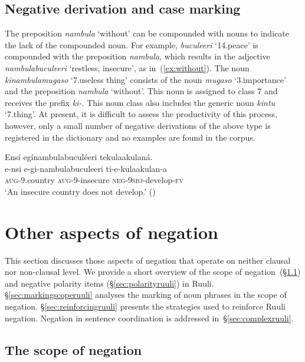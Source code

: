 \documentclass[output=paper,colorlinks,citecolor=brown,draftmode]{langscibook}
\begin{document}
\subsection{Negative derivation and case marking}
\label{sec:derivationruuli}

The preposition \textit{nambula} `without' can be compounded with nouns to indicate the lack of the compounded noun. 
For example, \textit{buculeeri} `14.peace' is compound\-ed with the  preposition \textit{nambula}, which results in the adjective \textit{nambulabuculeeri} `restless, insecure', as in~(\ref{ex:without}).
The noun \textit{kinambulamugaso} `7.useless thing' consists of the noun \textit{mugaso} `3.importance' and the preposition \textit{nambula} `without'. 
This noun is assigned to class 7 and receives the prefix \textit{ki-}.  This noun class also includes the generic noun \textit{kintu} `7.thing'.
At present, it is difficult to assess the productivity of this process, however, only a  small number of negative derivations of the above type is registered in the dictionary and no examples are found in the corpus.

\ea \label{ex:without}
	\glll   Ensí egínambulabuculéeri tekulaakulaná.\\
	        e-nsi e-gi-nambulabuculeeri ti-e-kulaakulan-a\\
	    	\textsc{aug}-9.country \textsc{aug}-9-insecure \textsc{neg}-9\textsc{sbj}-develop-\textsc{fv}\\
    \glt ‘An insecure country does not develop.' (\citealt[81]{NamyaloEtAl2021})
\z


\section{Other aspects of negation}\label{sec:otheraspectsruuli}

This section discusses those aspects of negation that operate on neither clausal nor non-clausal level.
We provide a short overview of the scope of negation~(§\ref{sec:scoperuuli}) and negative polarity items (§\ref{sec:polarityruuli}) in Ruuli. 
§\ref{sec:markingscoperuuli} analyses the marking of noun phrases in the scope of negation. §\ref{sec:reinforcingruuli} presents the strategies used to reinforce Ruuli negation. 
Negation in sentence coordination is addressed in~§\ref{sec:complexruuli}.


\subsection{The scope of negation} \label{sec:scoperuuli}
\end{document}

